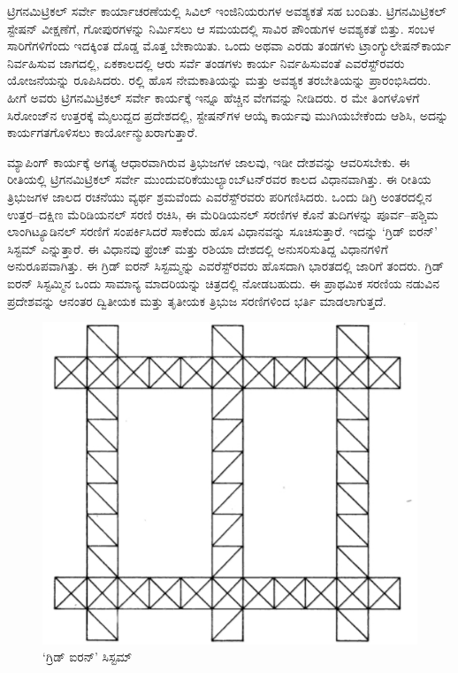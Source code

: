 ಟ್ರಿಗನಮಿಟ್ರಿಕಲ್​ ಸರ್ವೇ ಕಾರ್ಯಾಚರಣೆಯಲ್ಲಿ ಸಿವಿಲ್​ ಇಂಜಿನಿಯರುಗಳ ಅವಶ್ಯಕತೆ ಸಹ ಬಂದಿತು. ಟ್ರಿಗನಮಿಟ್ರಿಕಲ್​ ಸ್ಟೇಷನ್​ ವೀಕ್ಷಣೆಗೆ, ಗೋಪುರಗಳನ್ನು ನಿರ್ಮಿಸಲು ಆ ಸಮಯದಲ್ಲಿ  ಸಾವಿರ ಪೌಂಡುಗಳ ಅವಶ್ಯಕತೆ ಬಿತ್ತು. ಸಂಬಳ ಸಾರಿಗೆಗಳಿಗೆಂದು ಇದಕ್ಕಿಂತ ದೊಡ್ಡ ಮೊತ್ತ ಬೇಕಾಯಿತು. ಒಂದು ಅಥವಾ ಎರಡು ತಂಡಗಳು ಟ್ರಾಂಗ್ಯುಲೇಷನ್​ ಕಾರ್ಯ ನಿರ್ವಹಿಸುವ ಜಾಗದಲ್ಲಿ, ಏಕಕಾಲದಲ್ಲಿ ಆರು ಸರ್ವೆ ತಂಡಗಳು ಕಾರ್ಯ ನಿರ್ವಹಿಸುವಂತೆ ಎವರೆಸ್ಟ್​ರವರು ಯೋಜನೆಯನ್ನು ರೂಪಿಸಿದರು. ರಲ್ಲಿ ಹೊಸ ನೇಮಕಾತಿಯನ್ನು ಮತ್ತು ಅವಶ್ಯಕ ತರಬೇತಿಯನ್ನು ಪ್ರಾರಂಭಿಸಿದರು. ಹೀಗೆ ಅವರು ಟ್ರಿಗನಮಿಟ್ರಿಕಲ್​ ಸರ್ವೇ ಕಾರ್ಯಕ್ಕೆ ಇನ್ನೂ ಹೆಚ್ಚಿನ ವೇಗವನ್ನು ನೀಡಿದರು. ರ ಮೇ ತಿಂಗಳೊಳಗೆ ಸಿರೋಂಜ್​ನ ಉತ್ತರಕ್ಕೆ  ಮೈಲುದ್ದದ ಪ್ರದೇಶದಲ್ಲಿ, ಸ್ಟೇಷನ್​ಗಳ ಆಯ್ಕೆ ಕಾರ್ಯವು ಮುಗಿಯಬೇಕೆಂದು ಆಶಿಸಿ, ಅದನ್ನು ಕಾರ್ಯಗತಗೊಳಿಸಲು ಕಾರ್ಯೋನ್ಮುಖರಾಗುತ್ತಾರೆ.

ಮ್ಯಾಪಿಂಗ್​ ಕಾರ್ಯಕ್ಕೆ ಅಗತ್ಯ ಆಧಾರವಾಗಿರುವ ತ್ರಿಭುಜಗಳ ಜಾಲವು, ಇಡೀ ದೇಶವನ್ನು ಆವರಿಸಬೇಕು. ಈ ರೀತಿಯಲ್ಲಿ ಟ್ರಿಗನಮಿಟ್ರಿಕಲ್​ ಸರ್ವೇ ಮುಂದುವರಿಕೆಯು\break ಲ್ಯಾಂಬ್​ಟನ್​ರವರ ಕಾಲದ ವಿಧಾನವಾಗಿತ್ತು. ಈ ರೀತಿಯ ತ್ರಿಭುಜಗಳ ಜಾಲದ ರಚನೆಯು ವ್ಯರ್ಥ ಶ್ರಮವೆಂದು ಎವರೆಸ್ಟ್​ರವರು ಪರಿಗಣಿಸಿದರು. ಒಂದು ಡಿಗ್ರಿ ಅಂತರದಲ್ಲಿನ ಉತ್ತರ–ದಕ್ಷಿಣ ಮೆರಿಡಿಯನಲ್​ ಸರಣಿ ರಚಿಸಿ, ಈ ಮೆರಿಡಿಯನಲ್​ ಸರಣಿಗಳ ಕೊನೆ ತುದಿಗಳನ್ನು ಪೂರ್ವ–ಪಶ್ಚಿಮ ಲಾಂಗಿಟ್ಯೂಡಿನಲ್​ ಸರಣಿಗೆ ಸಂಪರ್ಕಿಸಿದರೆ ಸಾಕೆಂದು ಹೊಸ ವಿಧಾನವನ್ನು ಸೂಚಿಸುತ್ತಾರೆ. ಇದನ್ನು ‘ಗ್ರಿಡ್​ ಐರನ್​’ ಸಿಸ್ಟಮ್ ಎನ್ನುತ್ತಾರೆ. ಈ ವಿಧಾನವು ಫ್ರೆಂಚ್​ ಮತ್ತು ರಶಿಯಾ ದೇಶದಲ್ಲಿ ಅನುಸರಿಸುತಿದ್ದ ವಿಧಾನಗಳಿಗೆ ಅನುರೂಪವಾಗಿತ್ತು. ಈ ಗ್ರಿಡ್​ ಐರನ್​ ಸಿಸ್ಟಮ್ಮನ್ನು ಎವರೆಸ್ಟ್​ರವರು ಹೊಸದಾಗಿ ಭಾರತದಲ್ಲಿ ಜಾರಿಗೆ ತಂದರು. ಗ್ರಿಡ್​ ಐರನ್​ ಸಿಸ್ಟಮ್ಮಿನ ಒಂದು ಸಾಮಾನ್ಯ ಮಾದರಿಯನ್ನು ಚಿತ್ರದಲ್ಲಿ ನೋಡಬಹುದು. ಈ ಪ್ರಾಥಮಿಕ ಸರಣಿಯ ನಡುವಿನ ಪ್ರದೇಶವನ್ನು ಆನಂತರ ದ್ವಿತೀಯಕ ಮತ್ತು ತೃತೀಯಕ ತ್ರಿಭುಜ ಸರಣಿಗಳಿಂದ ಭರ್ತಿ ಮಾಡಲಾಗುತ್ತದೆ.

\begin{figure}[!htbp]
\includegraphics{"images/image013.jpg"}
\caption{‘ಗ್ರಿಡ್​ ಐರನ್​’ ಸಿಸ್ಟಮ್}\label{art11-fig1}
\end{figure}

